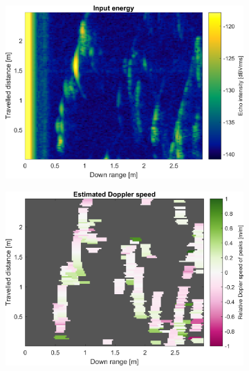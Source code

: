 \begin{figure}[htbp]
    \centering
    \begin{subfigure}[t]{0.475\linewidth}
        \centering
        \includegraphics[width=\linewidth,max height=.475\textheight]{gfx/results/attic_input.png}
    \end{subfigure}%
    \hfill%
    \begin{subfigure}[t]{0.475\linewidth}  
        \centering 
        \includegraphics[width=\linewidth,max height=.475\textheight]{gfx/results/attic_doppler.png}
    \end{subfigure}\bigskip\\
    \begin{subfigure}[t]{0.5\linewidth}   
        \centering 

\end{subfigure}
\end{figure}
